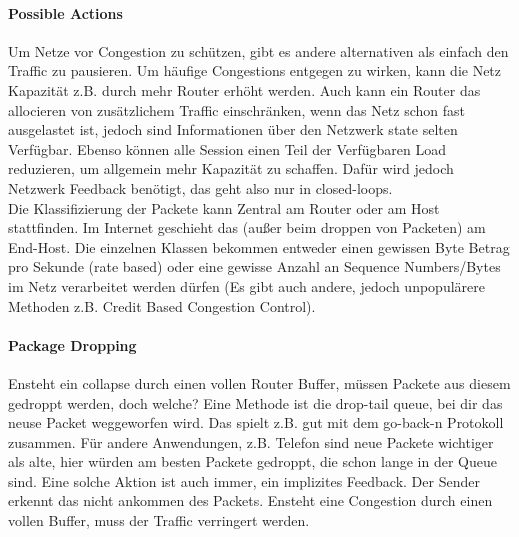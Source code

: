 			\paragraph{Possible Actions}
				Um Netze vor Congestion zu schützen, gibt es andere alternativen als einfach den Traffic zu pausieren. Um häufige Congestions entgegen zu wirken, kann die Netz Kapazität z.B. durch mehr Router erhöht werden. Auch kann ein Router das allocieren von zusätzlichem Traffic einschränken, wenn das Netz schon fast ausgelastet ist, jedoch sind Informationen über den Netzwerk state selten Verfügbar. Ebenso können alle Session einen Teil der Verfügbaren Load reduzieren, um allgemein mehr Kapazität zu schaffen. Dafür wird jedoch Netzwerk Feedback benötigt, das geht also nur in closed-loops. \\
				Die Klassifizierung der Packete kann Zentral am Router oder am Host stattfinden. Im Internet geschieht das (außer beim droppen von Packeten) am End-Host. Die einzelnen Klassen bekommen entweder einen gewissen Byte Betrag pro Sekunde (rate based) oder eine gewisse Anzahl an Sequence Numbers/Bytes im Netz verarbeitet werden dürfen (Es gibt auch andere, jedoch unpopulärere Methoden z.B. Credit Based Congestion Control). \\
			
			\paragraph{Package Dropping}
				Ensteht ein collapse durch einen vollen Router Buffer, müssen Packete aus diesem gedroppt werden, doch welche? Eine Methode ist die drop-tail queue, bei dir das neuse Packet weggeworfen wird. Das spielt z.B. gut mit dem go-back-n Protokoll zusammen. Für andere Anwendungen, z.B. Telefon sind neue Packete wichtiger als alte, hier würden am besten Packete gedroppt, die schon lange in der Queue sind. Eine solche Aktion ist auch immer, ein implizites Feedback. Der Sender erkennt das nicht ankommen des Packets. Ensteht eine Congestion durch einen vollen Buffer, muss der Traffic verringert werden. 
			
